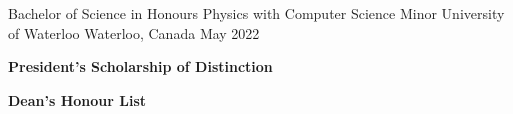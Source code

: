 
\begin{cventries}
  \cventry
    {Bachelor of Science in Honours Physics with Computer Science Minor} %
    {University of Waterloo} %
    {Waterloo, Canada} %
    {May 2022} %
    {
      \begin{cvitems} %
         \item {\textbf{President's Scholarship of Distinction}}
         \item {\textbf{Dean's Honour List}}
      \end{cvitems}
    }
\end{cventries}
